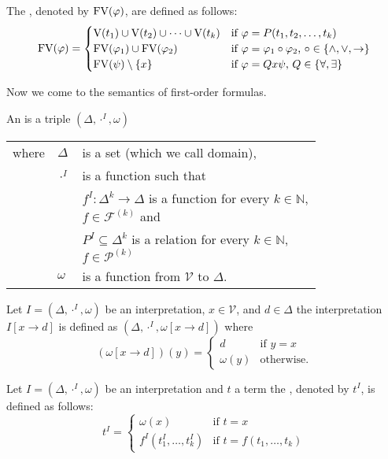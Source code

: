 \begin{definition}
The , denoted by $\text{FV}(\varphi)$, are defined as follows:
\[\text{FV}(\varphi)=
\begin{cases}
\text{V}(t_1)\cup \text{V}(t_2)\cup\dots\cup \text{V}(t_k) & \text{if $\varphi=P(t_1,t_2,\dots,t_k)$}\\
\text{FV}(\varphi_1)\cup\text{FV}(\varphi_2) & \text{if $\varphi=\varphi_1\circ\varphi_2$, $\circ\in\{\wedge,\vee,\to\}$}\\
\text{FV}(\psi)\setminus\{x\} & \text{if $\varphi=Q x\psi$, $Q\in\{\forall,\exists\}$}
\end{cases}\]
\end{definition}
Now we come to the semantics of first-order formulas.
\begin{definition}
An  is a triple $(\Delta,\cdot^I,\omega)$
\begin{tabular}{llp{0.78\linewidth}}
		where & $\Delta$      & is a set (which we call  domain),                                                                                                       \\
		      & $\cdot^I$ & is a function such that\\
		      & & $f^I:\Delta^k\to\Delta$  is a function for every $k\in\mathbb{N}$, $f\in\mathcal{F}^{(k)}$ and \\
		      & & $P^I\subseteq\Delta^k$ is a relation for every $k\in\mathbb{N}$, $f\in\mathcal{P}^{(k)}$ \\
		      & $\omega$ & is a function from $\mathcal{V}$ to $\Delta$.                       
	\end{tabular}
\end{definition}
Let $I=(\Delta,\cdot^I,\omega)$ be an interpretation, $x\in\mathcal{V}$, and $d\in\Delta$ the interpretation $I\left[x\to d\right]$ is defined as $(\Delta,\cdot^I,\omega\left[x\to d\right])$ where
\[(\omega\left[x\to d\right])(y)=
\begin{cases}
d & \text{if $y=x$}\\
\omega(y) & \text{otherwise.}
\end{cases}\]
\begin{definition}
Let $I=(\Delta,\cdot^I,\omega)$ be an interpretation and $t$ a term the , denoted by $t^I$, is defined as follows:
\[t^I=
\begin{cases}
\omega(x) & \text{if $t=x$}\\
f^I(t^I_1,\dots,t^I_k) & \text{if $t=f(t_1,\dots,t_k)$}
\end{cases}\]
\end{definition}
